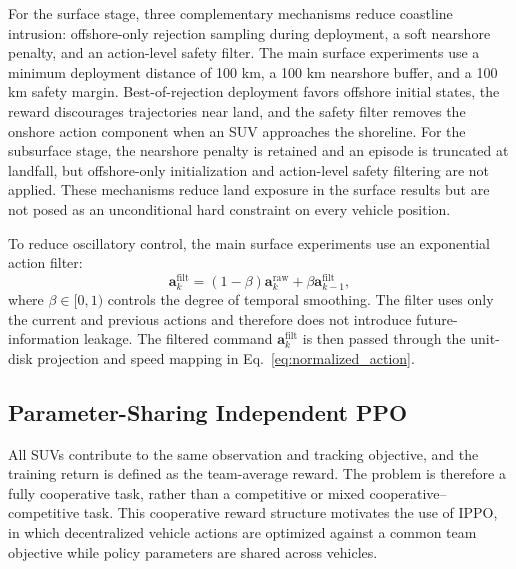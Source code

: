 \documentclass[a4paper,fleqn]{cas-dc}
\begin{document}
For the surface stage, three complementary mechanisms reduce coastline
intrusion: offshore-only rejection sampling during deployment, a soft nearshore
penalty, and an action-level safety filter. The main surface experiments use a
minimum deployment distance of 100 km, a 100 km nearshore buffer, and a 100 km
safety margin. Best-of-rejection deployment favors offshore initial states, the
reward discourages trajectories near land, and the safety filter removes the
onshore action component when an SUV approaches the shoreline. For the
subsurface stage, the nearshore penalty is retained and an episode is truncated
at landfall, but offshore-only initialization and action-level safety filtering
are not applied. These mechanisms reduce land exposure in the surface results
but are not posed as an unconditional hard constraint on every vehicle
position.

To reduce oscillatory control, the main surface experiments use an exponential
action filter:
\begin{equation}
\mathbf{a}^{\mathrm{filt}}_k=
(1-\beta)\mathbf{a}^{\mathrm{raw}}_k+
\beta\mathbf{a}^{\mathrm{filt}}_{k-1},
\label{eq:filter}
\end{equation}
where $\beta\in[0,1)$ controls the degree of temporal smoothing. The filter
uses only the current and previous actions and therefore does not introduce
future-information leakage. The filtered command
$\mathbf{a}^{\mathrm{filt}}_k$ is then passed through the unit-disk projection
and speed mapping in Eq.~\eqref{eq:normalized_action}.

\subsection{Parameter-Sharing Independent PPO}

All SUVs contribute to the same observation and tracking objective, and the
training return is defined as the team-average reward. The problem is therefore
a fully cooperative task, rather than a competitive or mixed
cooperative--competitive task. This cooperative reward structure motivates the
use of IPPO, in which decentralized vehicle actions are optimized against a
common team objective while policy parameters are shared across vehicles.
\end{document}
